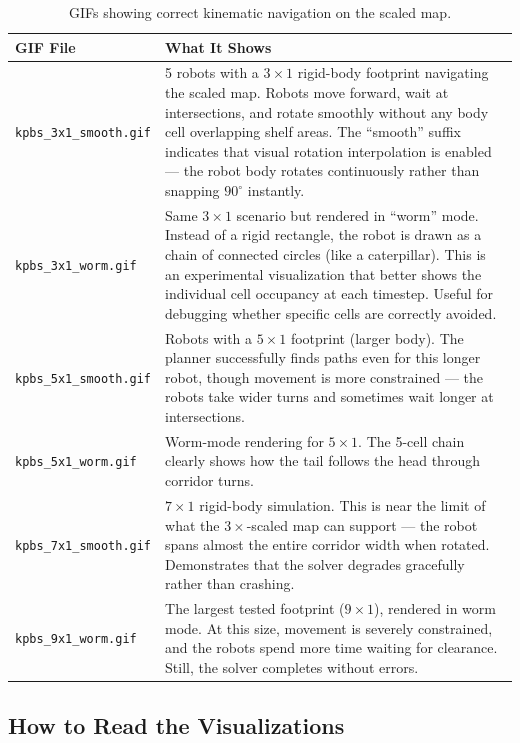 \documentclass[12pt, a4paper]{article}
\begin{document}
\begin{table}[H]
\centering
\begin{tabular}{@{}lp{10cm}@{}}
\toprule
\textbf{GIF File} & \textbf{What It Shows} \\
\midrule
\texttt{kpbs\_3x1\_smooth.gif} &
5 robots with a $3\times1$ rigid-body footprint navigating the scaled map. Robots move forward, wait at intersections, and rotate smoothly without any body cell overlapping shelf areas. The ``smooth'' suffix indicates that visual rotation interpolation is enabled --- the robot body rotates continuously rather than snapping $90^\circ$ instantly. \\
\addlinespace
\texttt{kpbs\_3x1\_worm.gif} &
Same $3\times1$ scenario but rendered in ``worm'' mode. Instead of a rigid rectangle, the robot is drawn as a chain of connected circles (like a caterpillar). This is an experimental visualization that better shows the individual cell occupancy at each timestep. Useful for debugging whether specific cells are correctly avoided. \\
\addlinespace
\texttt{kpbs\_5x1\_smooth.gif} &
Robots with a $5\times1$ footprint (larger body). The planner successfully finds paths even for this longer robot, though movement is more constrained --- the robots take wider turns and sometimes wait longer at intersections. \\
\addlinespace
\texttt{kpbs\_5x1\_worm.gif} &
Worm-mode rendering for $5\times1$. The 5-cell chain clearly shows how the tail follows the head through corridor turns. \\
\addlinespace
\texttt{kpbs\_7x1\_smooth.gif} &
$7\times1$ rigid-body simulation. This is near the limit of what the $3\times$-scaled map can support --- the robot spans almost the entire corridor width when rotated. Demonstrates that the solver degrades gracefully rather than crashing. \\
\addlinespace
\texttt{kpbs\_9x1\_worm.gif} &
The largest tested footprint ($9\times1$), rendered in worm mode. At this size, movement is severely constrained, and the robots spend more time waiting for clearance. Still, the solver completes without errors. \\
\bottomrule
\end{tabular}
\caption{GIFs showing correct kinematic navigation on the scaled map.}
\label{tab:after}
\end{table}

\subsection{How to Read the Visualizations}
\end{document}
